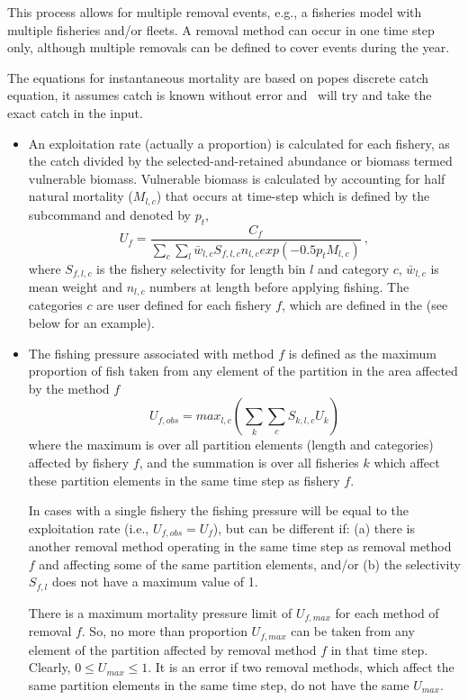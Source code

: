 This process allows for multiple removal events, e.g., a fisheries model with multiple fisheries and/or fleets. A removal method can occur in one time step only, although multiple removals can be defined to cover events during the year.

The equations for instantaneous mortality are based on popes discrete catch equation, it assumes catch is known without error and \CNAME\ will try and take the exact catch in the input.



\begin{itemize}
	\item An exploitation rate (actually a proportion) is calculated for each fishery, as the catch divided by the selected-and-retained abundance or biomass termed vulnerable biomass. Vulnerable biomass is calculated by accounting for half natural mortality (\(M_{l,c}\)) that occurs at time-step which is defined by the subcommand  and denoted by \(p_t\),
	$$U_{f} = \frac{C_f}{\sum\limits_{c}\sum\limits_l \bar{w}_{l,c} S_{f,l,c} n_{l,c} exp(-0.5 p_t M_{l,c})} \ ,$$
	where \(S_{f,l,c}\) is the fishery selectivity for length bin \(l\) and category \(c\), \(\bar{w}_{l,c}\) is mean weight and \(n_{l,c}\) numbers at length before applying fishing. The categories \(c\) are user defined for each fishery \(f\), which are defined in the  (see below for an example).
	\item The fishing pressure associated with method $f$ is defined as the maximum proportion of fish taken from any element of the partition in the area affected by the method $f$
	$$ U_{f,obs} = max_{l,c}(\sum\limits_k\sum\limits_c S_{k,l,c} U_k) $$
	where the maximum is over all partition elements (length and categories) affected by fishery $f$, and the summation is over all fisheries $k$ which affect these partition elements in the same time step as fishery $f$.
	
	In cases with a single fishery the fishing pressure will be equal to the exploitation rate (i.e., $U_{f,obs} = U_f$), but can be different if: (a) there is another removal method operating in the same time step as removal method $f$ and affecting some of the same partition elements, and/or (b) the selectivity $S_{f,l}$ does not have a maximum value of 1.
	
	There is a maximum mortality pressure limit of $U_{f,max}$ for each method of removal $f$. So, no more than proportion $U_{f,max}$ can be taken from any element of the partition affected by removal method $f$ in that time step. Clearly, $0 \leq U_{max} \leq 1$. It is an error if two removal methods, which affect the same partition elements in the same time step, do not have the same $U_{max}$.
	

\end{itemize}
